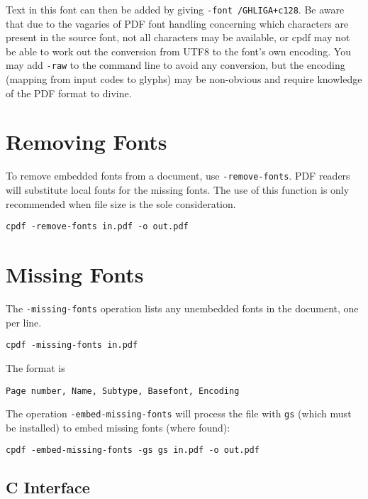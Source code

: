 \documentclass{book}
\begin{document}
\noindent Text in this font can then be added by giving \verb!-font /GHLIGA+c128!. Be
aware that due to the vagaries of PDF font handling concerning which characters
are present in the source font, not all characters may be available, or cpdf may not be able to work out the conversion from UTF8 to the font's own encoding. You may add \texttt{-raw} to the command line to avoid any conversion, but the encoding (mapping from input codes to glyphs) may be non-obvious and require knowledge of the PDF format to divine.

\section{Removing Fonts}
\label{removefont}

To remove embedded fonts from a document, use \verb!-remove-fonts!. PDF readers will
substitute local fonts for the missing fonts. The use of this function is only
recommended when file size is the sole consideration.

  \begin{framed}
  \small\noindent\verb!cpdf -remove-fonts in.pdf -o out.pdf!
  \vspace{2.5mm}
  \end{framed}

\section{Missing Fonts}
  The \verb!-missing-fonts! operation lists any unembedded fonts in the document, one per line.
  \begin{framed}
  \small\noindent\verb!cpdf -missing-fonts in.pdf!
  \end{framed}

  \noindent The format is
  \begin{framed}
  \small\noindent\verb!Page number, Name, Subtype, Basefont, Encoding!
  \end{framed}

\noindent The operation \texttt{-embed-missing-fonts} will process the file with \texttt{gs} (which must be installed) to embed missing fonts (where found):

  \begin{framed}
  \small\noindent\verb!cpdf -embed-missing-fonts -gs gs in.pdf -o out.pdf!
  \end{framed}

\label{listmisingfonts}\clearpage\pagestyle{empty}

\begin{cpdflib}
\clearpage
\section*{C Interface}
\begin{small}\tt

\end{small}
\end{cpdflib}
\end{document}
